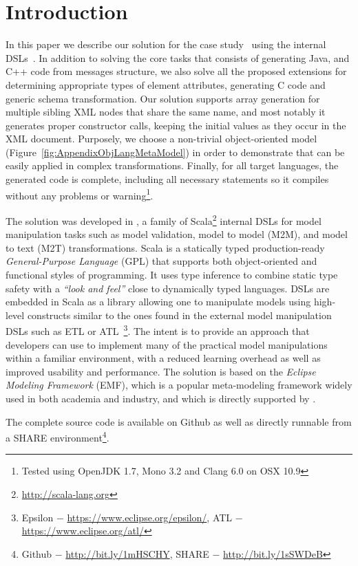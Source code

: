 

\section{Introduction}
\label{sec:Introduction}

In this paper we describe our solution for the \TTC \FIXML case study~\cite{Lano2014} using the \SIGMA internal DSLs~\cite{Krikava2014}.
In addition to solving the core tasks that consists of generating Java, \Csharp and C++ code from \FIXML messages structure, we also solve all the proposed extensions for determining appropriate types of element attributes, generating C code and generic \FIXML schema transformation.
Our solution supports array generation for multiple sibling XML nodes that share the same name, and most notably it generates proper constructor calls, keeping the initial values as they occur in the XML document.
Purposely, we choose a non-trivial object-oriented model (\Cf Figure~\ref{fig:AppendixObjLangMetaModel}) in order to demonstrate that \SIGMA can be easily applied in complex transformations.
Finally, for all target languages, the generated code is complete, including all necessary statements so it compiles without any problems or warning\footnote{Tested using OpenJDK 1.7, Mono 3.2 and Clang 6.0 on OSX 10.9}.

The solution was developed in \SIGMA, a family of Scala\footnote{\url{http://scala-lang.org}} internal DSLs for model manipulation tasks such as model validation, model to model (M2M), and model to text (M2T) transformations.
Scala is a statically typed production-ready \emph{General-Purpose Language} (GPL) that supports both object-oriented and functional styles of programming.
It uses type inference to combine static type safety with a \emph{``look and feel''} close to dynamically typed languages.
\SIGMA DSLs are embedded in Scala as a library allowing one to manipulate models using high-level constructs similar to the ones found in the external model manipulation DSLs such as ETL or ATL~\footnote{Epsilon $-$ \url{https://www.eclipse.org/epsilon/}, ATL $-$ \url{https://www.eclipse.org/atl/}}.
The intent is to provide an approach that developers can use to implement many of the practical model manipulations within a familiar environment, with a reduced learning overhead as well as improved usability and performance.
The solution is based on the \emph{Eclipse Modeling Framework} (EMF), which is a popular meta-modeling framework widely used in both academia and industry, and which is directly supported by \SIGMA.

The complete source code is available on Github as well as directly runnable from a SHARE environment\footnote{Github $-$ \url{http://bit.ly/1mHSCHY}, SHARE $-$ \url{http://bit.ly/1sSWDeB}}.